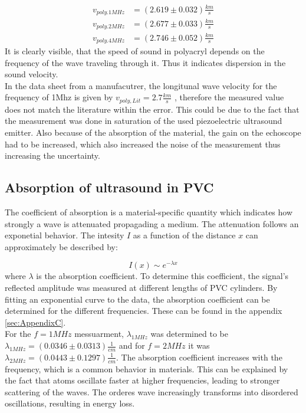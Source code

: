         \begin{equation*}
        \begin{split}
            v_{poly. 1MHz} & = (2.619 \pm 0.032) \frac{km}{s}\\
            v_{poly. 2MHz} & = (2.677 \pm 0.033) \frac{km}{s}\\
            v_{poly. 4MHz} & = (2.746 \pm 0.052) \frac{km}{s}
        \end{split}
        \end{equation*}
        \noindent
        It is clearly visible, that the speed of sound in polyacryl depends on the frequency of the wave traveling through it. Thus it indicates dispersion in
        the sound velocity. \\
        In the data sheet from a manufacutrer, the longitunal wave velocity for the frequency of 1Mhz is given by
        $v_{poly,Lit} = 2.7 \frac{km}{s}$ \cite{SchallgeschwindigkeitPolyacryl}, therefore the measured value does not match the literature within the error.
        This could be due to the fact that the measurement was done in saturation of the used piezoelectric ultrasound emitter. Also because of the absorption 
        of the material, the gain on the echoscope had to be increased, which also increased the noise of the measurement thus increasing the uncertainty.
        
    \subsection{Absorption of ultrasound in PVC} \label{subsec:absorption}

        The coefficient of absorption is a material-specific quantity which indicates how strongly a wave is attenuated propagading a medium. The attenuation follows an exponetial behavior.
        The intesity $I$ as a function of the distance $x$ can approximately be described by:

        \begin{equation}
            I(x) \sim e^{-\lambda x}
        \end{equation}
        \noindent
        where $\lambda$ is the absorption coefficient. To determine this coefficient, the signal's reflected amplitude was measured at different lengths of PVC cylinders. By fitting an
        exponential curve to the data, the absorption coefficient can be determined for the different frequencies. These can be found in the appendix \ref{sec:AppendixC}. \\
        For the $f=1MHz$ messuarment, $\lambda_{1 MHz}$ was determined to be $\lambda_{1 MHz} = (0.0346 \pm 0.0313) \frac{1}{cm}$ and for $f=2MHz$ it was 
        $\lambda_{2 MHz} = (0.0443 \pm 0.1297) \frac{1}{cm}$.
        The absorption coefficient increases with the frequency, which is a common behavior in materials. This can be explained by the fact that atoms oscillate faster at higher frequencies, 
        leading to stronger scattering of the waves. The orderes wave increasingly transforms into disordered oscillations, resulting in energy loss. \\


